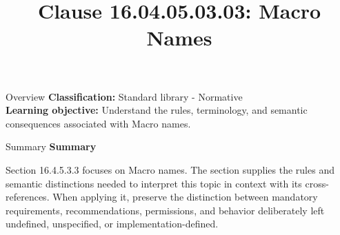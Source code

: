 \documentclass[10pt,letterpaper]{article}
\title{Clause 16.04.05.03.03: Macro Names}
\author{}
\date{}
\begin{document}
\maketitle
\begin{CornellOverviewBox}{Overview}
\textbf{Classification:} Standard library - Normative\\[2pt]
\textbf{Learning objective:} Understand the rules, terminology, and semantic consequences associated with Macro names.
\end{CornellOverviewBox}\begin{CornellSummaryBox}{Summary}
{\sffamily\bfseries\color{Accent} Summary}\par\vspace{3pt}Section 16.4.5.3.3 focuses on Macro names. The section supplies the rules and semantic distinctions needed to interpret this topic in context with its cross-references. When applying it, preserve the distinction between mandatory requirements, recommendations, permissions, and behavior deliberately left undefined, unspecified, or implementation-defined.
\end{CornellSummaryBox}
\end{document}
